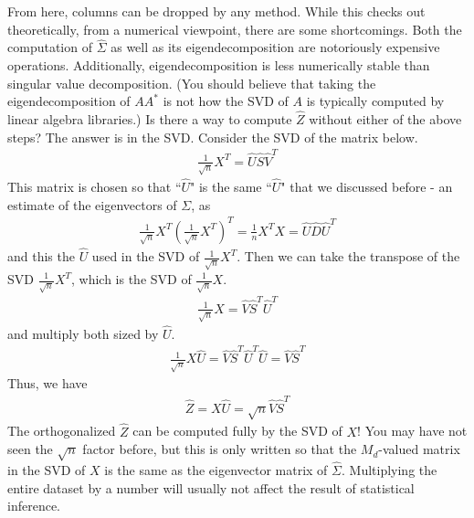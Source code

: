 \documentclass[11pt]{article}
\theoremstyle{plain}
\theoremstyle{definition}
\theoremstyle{remark}
\begin{document}
From here, columns can be dropped by any method. While this checks out theoretically, from a numerical viewpoint, there are some shortcomings. Both the computation of $\hat{\Sigma}$ as well as its eigendecomposition are notoriously expensive operations. Additionally, eigendecomposition is less numerically stable than singular value decomposition. (You should believe that taking the eigendecomposition of $AA^*$ is not how the SVD of $A$ is typically computed by linear algebra libraries.) Is there a way to compute $\hat{Z}$ without either of the above steps? The answer is in the SVD. Consider the SVD of the matrix below.
\begin{align*}
    \tfrac{1}{\sqrt{n}} X^T = \hat{U} \hat{S} \hat{V}^T 
\end{align*}
This matrix is chosen so that ``$\hat{U}$" is the same ``$\hat{U}$" that we discussed before - an estimate of the eigenvectors of $\Sigma$, as
\begin{align*}
    \tfrac{1}{\sqrt{n}} X^T \left(\tfrac{1}{\sqrt{n}} X^T\right)^T = \tfrac{1}{n} X^T X = \hat{U} \hat{D} \hat{U}^T 
\end{align*}
and this the $\hat{U}$ used in the SVD of $\tfrac{1}{\sqrt{n}} X^T$. Then we can take the transpose of the SVD $\tfrac{1}{\sqrt{n}} X^T$, which is the SVD of $\tfrac{1}{\sqrt{n}} X$.
\begin{align*}
    \tfrac{1}{\sqrt{n}} X = \hat{V} \hat{S}^T \hat{U}^T
\end{align*}
and multiply both sized by $\hat{U}$.
\begin{align*}
    \tfrac{1}{\sqrt{n}} X \hat{U} = \hat{V} \hat{S}^T \hat{U}^T \hat{U} = \hat{V} \hat{S}^T
\end{align*}
Thus, we have
\begin{align*}
    \hat{Z} = X \hat{U} = \sqrt{n} \hat{V} \hat{S}^T
\end{align*}
The orthogonalized $\hat{Z}$ can be computed fully by the SVD of $X$! You may have not seen the $\sqrt{n}$ factor before, but this is only written so that the $M_d$-valued matrix in the SVD of $X$ is the same as the eigenvector matrix of $\hat{\Sigma}$. Multiplying the entire dataset by a number will usually not affect the result of statistical inference.
\end{document}

